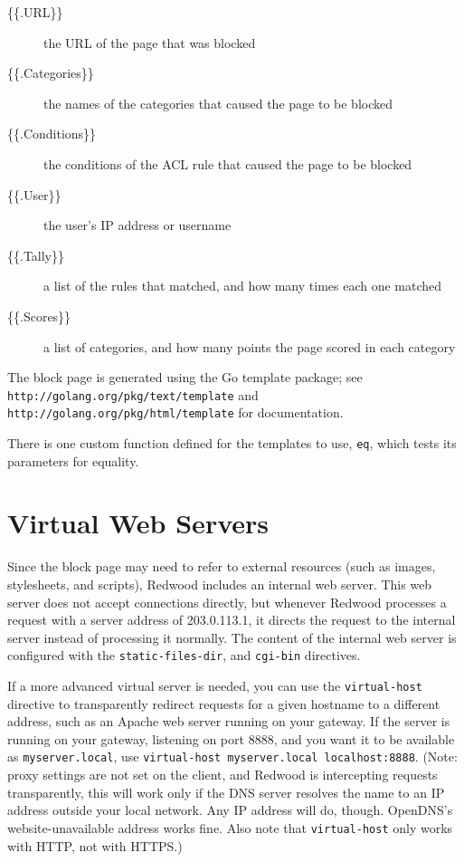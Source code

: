 \documentclass{article}
\begin{document}
\begin{description}

\item[\{\{.URL\}\}] the URL of the page that was blocked
\item[\{\{.Categories\}\}] the names of the categories that caused the page to be blocked
\item[\{\{.Conditions\}\}] the conditions of the ACL rule that caused the page to be blocked
\item[\{\{.User\}\}] the user's IP address or username
\item[\{\{.Tally\}\}] a list of the rules that matched, and how many times each one matched
\item[\{\{.Scores\}\}] a list of categories, and how many points the page scored in each category

\end{description}

The block page is generated using the Go template package; see
\verb"http://golang.org/pkg/text/template"
and
\verb"http://golang.org/pkg/html/template"
for documentation.

There is one custom function defined for the templates to use, \verb"eq", 
which tests its parameters for equality.

\section{Virtual Web Servers}

Since the block page may need to refer to external resources
(such as images, stylesheets, and scripts),
Redwood includes an internal web server.
This web server does not accept connections directly,
but whenever Redwood processes a request with a server address of 203.0.113.1,
it directs the request to the internal server instead of processing it normally.
The content of the internal web server is configured with the 
\verb"static-files-dir", and \verb"cgi-bin" directives.

If a more advanced virtual server is needed, you can use the \verb"virtual-host"
directive to transparently redirect requests for a given hostname to a different address,
such as an Apache web server running on your gateway.
If the server is running on your gateway, listening on port 8888, and you want it to be 
available as \verb"myserver.local", use \verb"virtual-host myserver.local localhost:8888".
(Note: proxy settings are not set on the client, and Redwood is intercepting
requests transparently, this will work only if the DNS server resolves the name
to an IP address outside your local network. 
Any IP address will do, though. OpenDNS's website-unavailable address works fine.
Also note that \verb"virtual-host" only works with HTTP, not with HTTPS.)
\end{document}
